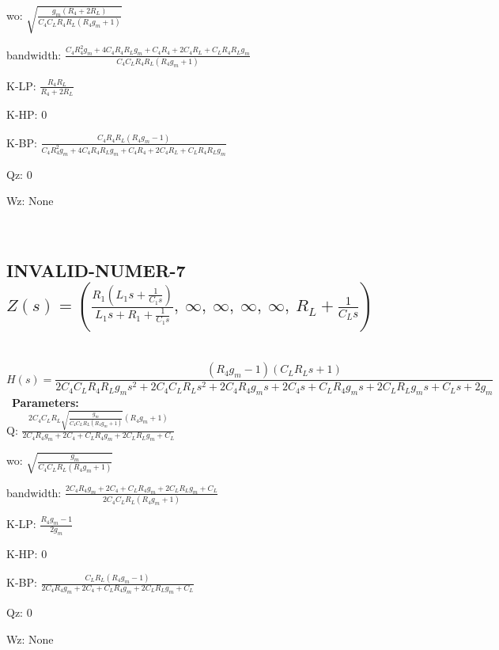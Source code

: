 \documentclass{article}
\begin{document}
wo: $\sqrt{\frac{g_{m} \left(R_{4} + 2 R_{L}\right)}{C_{4} C_{L} R_{4} R_{L} \left(R_{4} g_{m} + 1\right)}}$\ 

bandwidth: $\frac{C_{4} R_{4}^{2} g_{m} + 4 C_{4} R_{4} R_{L} g_{m} + C_{4} R_{4} + 2 C_{4} R_{L} + C_{L} R_{4} R_{L} g_{m}}{C_{4} C_{L} R_{4} R_{L} \left(R_{4} g_{m} + 1\right)}$\ 

K-LP: $\frac{R_{4} R_{L}}{R_{4} + 2 R_{L}}$\ 

K-HP: $0$\ 

K-BP: $\frac{C_{4} R_{4} R_{L} \left(R_{4} g_{m} - 1\right)}{C_{4} R_{4}^{2} g_{m} + 4 C_{4} R_{4} R_{L} g_{m} + C_{4} R_{4} + 2 C_{4} R_{L} + C_{L} R_{4} R_{L} g_{m}}$\ 

Qz: $0$\ 

Wz: $\text{None}$\ 

\ 

\subsection{INVALID-NUMER-7 $Z(s) = \left( \frac{R_{1} \left(L_{1} s + \frac{1}{C_{1} s}\right)}{L_{1} s + R_{1} + \frac{1}{C_{1} s}}, \  \infty, \  \infty, \  \infty, \  \infty, \  R_{L} + \frac{1}{C_{L} s}\right)$ } \ 
\textbf{\[H(s) = \frac{\left(R_{4} g_{m} - 1\right) \left(C_{L} R_{L} s + 1\right)}{2 C_{4} C_{L} R_{4} R_{L} g_{m} s^{2} + 2 C_{4} C_{L} R_{L} s^{2} + 2 C_{4} R_{4} g_{m} s + 2 C_{4} s + C_{L} R_{4} g_{m} s + 2 C_{L} R_{L} g_{m} s + C_{L} s + 2 g_{m}}\] } \ 
\textbf{Parameters:}\\ 

Q: $\frac{2 C_{4} C_{L} R_{L} \sqrt{\frac{g_{m}}{C_{4} C_{L} R_{L} \left(R_{4} g_{m} + 1\right)}} \left(R_{4} g_{m} + 1\right)}{2 C_{4} R_{4} g_{m} + 2 C_{4} + C_{L} R_{4} g_{m} + 2 C_{L} R_{L} g_{m} + C_{L}}$\ 

wo: $\sqrt{\frac{g_{m}}{C_{4} C_{L} R_{L} \left(R_{4} g_{m} + 1\right)}}$\ 

bandwidth: $\frac{2 C_{4} R_{4} g_{m} + 2 C_{4} + C_{L} R_{4} g_{m} + 2 C_{L} R_{L} g_{m} + C_{L}}{2 C_{4} C_{L} R_{L} \left(R_{4} g_{m} + 1\right)}$\ 

K-LP: $\frac{R_{4} g_{m} - 1}{2 g_{m}}$\ 

K-HP: $0$\ 

K-BP: $\frac{C_{L} R_{L} \left(R_{4} g_{m} - 1\right)}{2 C_{4} R_{4} g_{m} + 2 C_{4} + C_{L} R_{4} g_{m} + 2 C_{L} R_{L} g_{m} + C_{L}}$\ 

Qz: $0$\ 

Wz: $\text{None}$\ 
\end{document}
